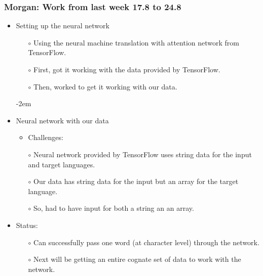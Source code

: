 \documentclass[a4paper, 14pt]{article}
\begin{document}
\begin{frame}
    \frametitle{Morgan: Work from last week 17.8 to 24.8}
    \begin{itemize}
    \itemsep-2em
        \item Setting up the neural network
        \begin{itemize}
        \itemsep-2em
            \item[$\circ$] Using the neural machine translation with attention network from TensorFlow.
            \item[$\circ$] First, got it working with the data provided by TensorFlow.
            \item[$\circ$] Then, worked to get it working with our data.
        \end{itemize}
        \itemsep-2em
        \item Neural network with our data
        \begin{itemize}
        \itemsep-2em
            \item Challenges:
        \end{itemize}
        \begin{itemize}
        \itemsep-1em
            \item[$\circ$] Neural network provided by TensorFlow uses string data for the input and target languages.
             \item[$\circ$] Our data has string data for the input but an array for the target language.
             \item[$\circ$] So, had to have input for both a string an an array.
        \end{itemize}
        \item Status:
        \begin{itemize}
        \itemsep-1em
            \item[$\circ$] Can successfully pass one word (at character level) through the network.
            \item[$\circ$] Next will be getting an entire cognate set of data to work with the network.
        \end{itemize}
    \end{itemize}
    
\end{frame}
\end{document}
